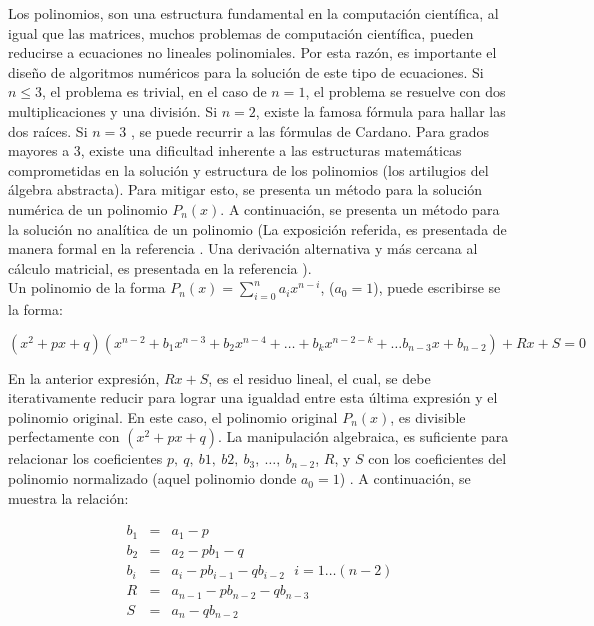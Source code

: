 \documentclass[11pt, spanish]{article}
\begin{document}
Los polinomios, son una estructura fundamental en la computación científica, al igual que las matrices, muchos problemas de computación científica, pueden reducirse a ecuaciones no lineales polinomiales. Por esta razón, es importante el diseño de algoritmos numéricos para la solución de este tipo de ecuaciones. Si $n \leq 3$, el problema es trivial, en el caso de $n = 1$, el problema se resuelve con dos multiplicaciones y una división. Si $n = 2$, existe la famosa fórmula para hallar las dos raíces. Si $n = 3$ , se puede recurrir a las fórmulas de Cardano. Para grados mayores a 3, existe una dificultad inherente a las estructuras matemáticas comprometidas en la solución y estructura de los polinomios (los artilugios del álgebra abstracta). Para mitigar esto, se presenta un método para la solución numérica de un polinomio $P_n(x)$. A continuación, se presenta un método para la solución no analítica de un polinomio (La exposición referida, es presentada de manera formal en la referencia \cite{rosloniec2008fundamental}. Una derivación alternativa y más cercana al cálculo matricial, es presentada en la referencia \cite{miller2014numerical}).\\

Un polinomio de la forma $P_n(x) = \sum_{i = 0}^{n} a_ix^{n - i}$, ($a_0 = 1$), puede escribirse se la forma:

$$(x^2+px+q)(x^{n - 2} + b_{1}x^{n - 3} + b_{2}x^{n-4} + \dots + b_{k}x^{n-2-k} + \dots b_{n-3}x + b_{n-2}) + Rx + S = 0$$

En la anterior expresión, $Rx + S$, es el residuo lineal, el cual, se debe iterativamente reducir para lograr una igualdad entre esta última expresión y el polinomio original. En este caso, el polinomio original $P_n(x)$, es divisible perfectamente con $(x^2+px+q)$. La manipulación algebraica, es suficiente para relacionar los coeficientes $p,\ q,\ b1,\ b2,\ b_3,\ \dots,\ b_{n-2}$, $R$, y $S$ con los coeficientes del polinomio normalizado (aquel polinomio donde $a_0 = 1$) . A continuación, se muestra la relación:

\begin{eqnarray*}
b_{1} & = & a_{1} - p \\
b_{2} & = & a_{2} - p b_{1} - q \\
b_{i} & = & a_{i} - p b_{i - 1} - qb_{i - 2}\ \ \ i = 1 \dots (n - 2) \\
R & = & a_{n-1} - p b_{n-2} - qb_{n-3} \\
S & = & a_{n} - qb_{n - 2}
\end{eqnarray*}
\end{document}
